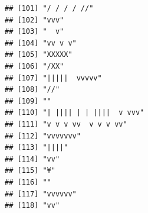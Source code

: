 \documentclass[
]{article}
\begin{document}
\begin{verbatim}
## [101] "/ / / / //"                                                                                                                               
## [102] "vvv"                                                                                                                                      
## [103] "  v"                                                                                                                                      
## [104] "vv v v"                                                                                                                                   
## [105] "XXXXX"                                                                                                                                    
## [106] "/XX"                                                                                                                                      
## [107] "|||||  vvvvv"                                                                                                                             
## [108] "//"                                                                                                                                       
## [109] ""                                                                                                                                         
## [110] "| |||| | | ||||  v vvv"                                                                                                                   
## [111] "v v v vv  v v v vv"                                                                                                                       
## [112] "vvvvvvv"                                                                                                                                  
## [113] "||||"                                                                                                                                     
## [114] "vv"                                                                                                                                       
## [115] "¥"                                                                                                                                        
## [116] ""                                                                                                                                         
## [117] "vvvvvv"                                                                                                                                   
## [118] "vv"                                                                                                                                       

\end{verbatim}
\end{document}
